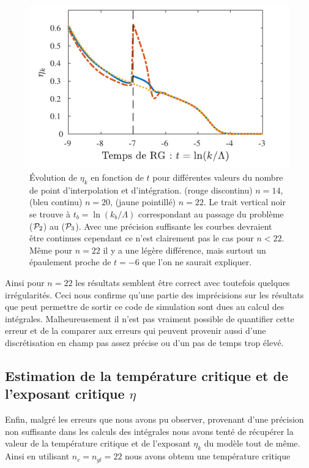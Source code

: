 \documentclass[10pt]{article}
\begin{document}
\begin{multicols}{2}
\begin{figure}[H]
\begin{center}
	\includegraphics[width=0.95\columnwidth]{EtakErrMesu.pdf}
\end{center}
\caption{Évolution de $\eta_k$ en fonction de $t$ pour différentes valeurs du nombre de point d'interpolation et d'intégration. (rouge discontinu) $n=14$, (bleu continu) $n=20$, (jaune pointillé) $n=22$. Le trait vertical noir se trouve à $t_b = \ln(k_b/\Lambda)$ correspondant au passage du problème ($\mathcal{P}_2$) au ($\mathcal{P}_3$). Avec une précision suffisante les courbes devraient être continues cependant ce n'est clairement pas le cas pour $n<22$. Même pour $n=22$ il y a une légère différence, mais surtout un épaulement proche de $t=-6$ que l'on ne saurait expliquer.}
\label{fig:etaErr}
\end{figure}

Ainsi pour $n=22$ les résultats semblent être correct avec toutefois quelques irrégularités. Ceci nous confirme qu'une partie des imprécisions sur les résultats que peut permettre de sortir ce code de simulation sont dues au calcul des intégrales. Malheureusement il n'est pas vraiment possible de quantifier cette erreur et de la comparer aux erreurs qui peuvent provenir aussi d'une discrétisation en champ pas assez précise ou d'un pas de temps trop élevé. \\



\subsection{Estimation de la température critique et de l'exposant critique $\eta$}

Enfin, malgré les erreurs que nous avons pu observer, provenant d'une précision non suffisante dans les calculs des intégrales nous avons tenté de récupérer la valeur de la température critique et de l'exposant $\eta_k$ du modèle tout de même. Ainsi en utilisant $n_c = n_{gl} = 22$ nous avons obtenu une température critique 


\end{multicols}
\end{document}
